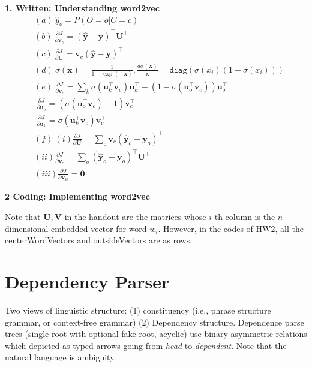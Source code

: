 \textbf{1. Written: Understanding word2vec}
\begin{align*}
	&(a) \ \hat{y}_o = P(O = o | C = c) \\
	&(b) \ \frac{\partial J}{\partial \bm{v}_c} = (\hat{\bm{y}} - \bm{y})^\top \bm{U}^\top \\
	&(c) \ \frac{\partial J}{\partial \bm{U}} = \bm{v}_c (\hat{\bm{y}} - \bm{y})^\top \\
	&(d) \ \sigma (\bm{x}) = \frac{1}{1 + \exp (- \bm{x})}, \frac{d \sigma (\bm{x})}{\bm{x}} = \texttt{diag} (\sigma (x_i) (1 - \sigma (x_i))) \\
	&(e) \ \frac{\partial J}{\partial \bm{v}_c} = \sum_k \sigma (\bm{u}_k^\top \bm{v}_c) \bm{u}_k^\top - (1 - \sigma (\bm{u}_o^\top \bm{v}_c)) \bm{u}_o^\top \\
	& \ \frac{\partial J}{\partial \bm{u}_o} = (\sigma (\bm{u}_o^\top \bm{v}_c) - 1) \bm{v}_c^\top \\
	& \ \frac{\partial J}{\partial \bm{u}_k} = \sigma (\bm{u}_k^\top \bm{v}_c) \bm{v}_c^\top \\
	&(f) \ (i) \frac{\partial J}{\partial \bm{U}} = \sum_o \bm{v}_c (\hat{\bm{y}}_o - \bm{y}_o)^\top \\
	&(ii) \frac{\partial J}{\partial \bm{v}_c} = \sum_o (\hat{\bm{y}}_o - \bm{y}_o)^\top \bm{U}^\top \\
	&(iii) \frac{\partial J}{\partial \bm{v}_w} = \bm{0}
\end{align*}


\textbf{2 Coding: Implementing word2vec}

Note that $\bm{U}, \bm{V}$ in the handout are the matrices whose $i$-th column is the $n$-dimensional embedded vector for word $w_i$.
However, in the codes of HW2, all the centerWordVectors and outsideVectors are as rows.

\section{Dependency Parser}
Two views of linguistic structure: (1) constituency (i.e., phrase structure grammar, or context-free grammar) (2) Dependency structure.
Dependence parse trees (single root with optional fake root, acyclic) use binary asymmetric relations which depicted as typed arrows going from \emph{head} to \emph{dependent}.
Note that the natural language is ambiguity.

